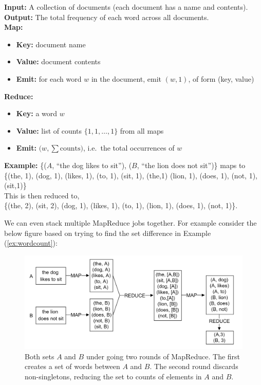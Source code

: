 \begin{Example}

    \label{ex:wordcount}
    \noindent\textbf{Input:} A collection of documents (each document has a name and contents).\\
    \noindent\textbf{Output:} The total frequency of each word across all documents.\\[0.5em]

    \noindent\textbf{Map:}
    \begin{itemize}
      \item \textbf{Key:} document name  
      \item \textbf{Value:} document contents  
      \item \textbf{Emit:} for each word \(w\) in the document, emit \((w,1)\), of form (key, value)
    \end{itemize}

    \noindent\textbf{Reduce:}
    \begin{itemize}
      \item \textbf{Key:} a word \(w\)  
      \item \textbf{Value:} list of counts \(\{1,1,\dots,1\}\) from all maps  
      \item \textbf{Emit:} \(\bigl(w,\sum \text{counts}\bigr)\), i.e.\ the total occurrences of \(w\)
    \end{itemize}

    \noindent\textbf{Example:} \{($A$, ``the dog likes to sit''), ($B$, ``the lion does not sit'')\}
    maps to\\
    \{(the, 1), (dog, 1), (likes, 1), (to, 1), (sit, 1), (the,1) (lion, 1), (does, 1), (not, 1),(sit,1)\}\\[0.5em]
    This is then reduced to,\\
    \{(the, 2), (sit, 2), (dog, 1), (likes, 1), (to, 1), (lion, 1), (does, 1), (not, 1)\}.
\end{Example}

\newpage 

\noindent
We can even stack multiple MapReduce jobs together. For example consider the below figure based on trying to find the 
set difference in Example (\ref{ex:wordcount}):

\begin{figure}[h]
    \centering
    \includegraphics[width=\textwidth]{Sections/mapreduce/multi.png}
    \caption{Both sets $A$ and $B$ under going two rounds of MapReduce. The first creates a set of words between $A$ and $B$. The 
    second round discards non-singletons, reducing the set to counts of elements in $A$ and $B$.}
    \label{fig:mapreduce}
\end{figure}

